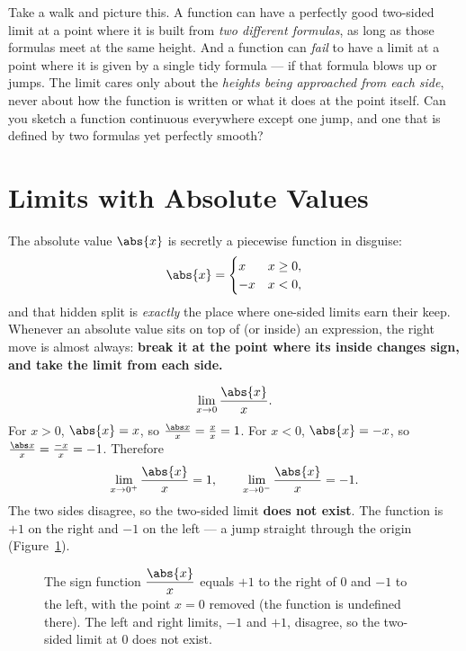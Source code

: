 \begin{walkbox}
Take a walk and picture this. A function can have a perfectly good two-sided
limit at a point where it is built from \emph{two different formulas}, as long
as those formulas meet at the same height. And a function can \emph{fail} to
have a limit at a point where it is given by a single tidy formula --- if that
formula blows up or jumps. The limit cares only about the \emph{heights being
approached from each side}, never about how the function is written or what it
does at the point itself. Can you sketch a function continuous everywhere
except one jump, and one that is defined by two formulas yet perfectly smooth?
\end{walkbox}

\section{Limits with Absolute Values}
\label{ch07:absvalue}

The absolute value $\abs{x}$ is secretly a piecewise function in disguise:
\[
  \abs{x} = \begin{cases} x & x \ge 0,\\ -x & x < 0,\end{cases}
\]
and that hidden split is \emph{exactly} the place where one-sided limits earn
their keep. Whenever an absolute value sits on top of (or inside) an
expression, the right move is almost always: \textbf{break it at the point
where its inside changes sign, and take the limit from each side.}

\begin{example}
\label{ch07:ex-absx}
\[
  \lim_{x\to 0}\frac{\abs{x}}{x}.
\]
For $x>0$, $\abs{x}=x$, so $\frac{\abs x}{x} = \frac{x}{x} = 1$. For $x<0$,
$\abs{x}=-x$, so $\frac{\abs x}{x} = \frac{-x}{x} = -1$. Therefore
\[
  \lim_{x\to 0^{+}}\frac{\abs{x}}{x} = 1,
  \qquad
  \lim_{x\to 0^{-}}\frac{\abs{x}}{x} = -1.
\]
The two sides disagree, so the two-sided limit \textbf{does not exist}. The
function is $+1$ on the right and $-1$ on the left --- a jump straight through
the origin (Figure~\ref{ch07:fig-absx}).
\end{example}

\begin{figure}[h]
\centering
{}
\caption{The sign function $\dfrac{\abs{x}}{x}$ equals $+1$ to the right of $0$
and $-1$ to the left, with the point $x=0$ removed (the function is undefined
there). The left and right limits, $-1$ and $+1$, disagree, so the two-sided
limit at $0$ does not exist.}
\label{ch07:fig-absx}
\end{figure}


